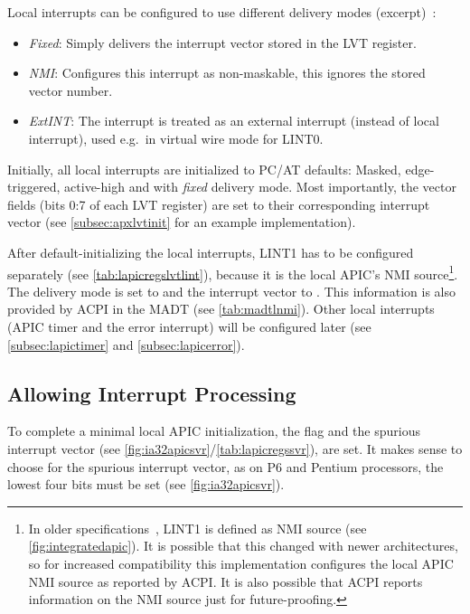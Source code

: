 Local interrupts can be configured to use different delivery modes (excerpt)~\autocite[sec.~3.11.5.1]{ia32}:

\begin{itemize}
  \item \textit{Fixed}: Simply delivers the interrupt vector stored in the LVT register.
  \item \textit{NMI}: Configures this interrupt as non-maskable, this ignores the stored vector number.
  \item \textit{ExtINT}: The interrupt is treated as an external interrupt (instead of local interrupt), used e.g.\ in virtual wire mode for LINT0\@.
\end{itemize}

Initially, all local interrupts are initialized to PC/AT defaults: Masked, edge-triggered, active-high and with \textit{fixed} delivery mode.
Most importantly, the vector fields (bits 0:7 of each LVT register) are set to their corresponding interrupt vector (see \autoref{subsec:apxlvtinit} for an example implementation).

After default-initializing the local interrupts, LINT1 has to be configured separately (see \autoref{tab:lapicregslvtlint}), because it is the local APIC's NMI source\footnote{
  In older specifications~\autocite{mpspec}, LINT1 is defined as NMI source (see \autoref{fig:integratedapic}).
  It is possible that this changed with newer architectures, so for increased compatibility this implementation configures the local APIC NMI source as reported by ACPI\@.
  It is also possible that ACPI reports information on the NMI source just for future-proofing.}.
The delivery mode is set to  and the interrupt vector to .
This information is also provided by ACPI in the MADT (see \autoref{tab:madtlnmi}).
Other local interrupts (APIC timer and the error interrupt) will be configured later (see \autoref{subsec:lapictimer} and \autoref{subsec:lapicerror}).

\subsection{Allowing Interrupt Processing}
\label{subsec:lapicsoftenable}

To complete a minimal local APIC initialization, the  flag and the spurious interrupt vector (see \autoref{fig:ia32apicsvr}/\autoref{tab:lapicregssvr}), are set.
It makes sense to choose  for the spurious interrupt vector, as on P6 and Pentium processors, the lowest four bits must be set (see \autoref{fig:ia32apicsvr}).

